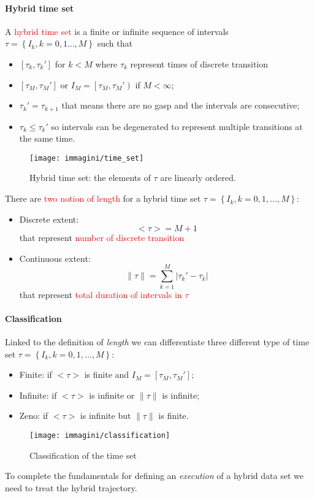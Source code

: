 \paragraph{Hybrid time set} A \textcolor{red}{hybrid time set} is a finite or infinite sequence of intervals $\tau = \left\{I_k,k=0,1\dots,M\right\}$ such that
\begin{itemize}		
	\item$\left[\tau_k,\tau_k'\right] $ for $ k < M$ where $\tau_k$ represent times of discrete transition
	\item$\left[\tau_M,\tau_M'\right]$ or $I_M=\left[\tau_M,\tau_M'\right) $ if $ M<\infty$;
	\item $\tau_k' = \tau_{k+1}$ that means there are no gasp and the intervals are consecutive;
	\item $\tau_k \le \tau_k'$ so intervals can be degenerated to represent multiple transitions at the same time.
\end{itemize}
\begin{figure}[h]
	\centering
	\label{fig:timeset}
	\texttt{[image: immagini/time\_set]}
	\caption{Hybrid time set: the elements of $\tau$ are linearly ordered.}
\end{figure}

There are \textcolor{red}{two notion of length} for a hybrid time set $\tau = \left\{I_k, k=0,1,\dots,M\right\}$:
\begin{itemize}
	\item Discrete extent:
	\[<\tau>=M+1 \] that represent \textcolor{red}{number of discrete transition}
	\item Continuous extent:
	\[ \|\tau\|=\sum\limits_{k=1}^M |\tau_k'-\tau_k| \] that represent \textcolor{red}{total duration of intervals in $\tau$}
\end{itemize}
\paragraph{Classification}  Linked to the definition of \emph{length} we can differentiate three different type of time set $\tau = \left\{I_k, k=0,1,\dots,M\right\}$:
\begin{itemize}
	\item Finite: if $<\tau>$ is finite and $I_M=\left[ \tau_M,\tau_M'\right]$;
	\item Infinite: if  $<\tau>$ is infinite or $\|\tau\|$ is infinite;
	\item Zeno: if  $<\tau>$ is infinite but $\|\tau\|$ is finite.
\end{itemize}
\begin{figure}[h]
	\centering
	\texttt{[image: immagini/classification]}
	\label{fig:classification}
	\caption{Classification of the time set}
\end{figure}
To complete the fundamentals for defining an \emph{execution} of a hybrid data set we need to treat the hybrid trajectory.
